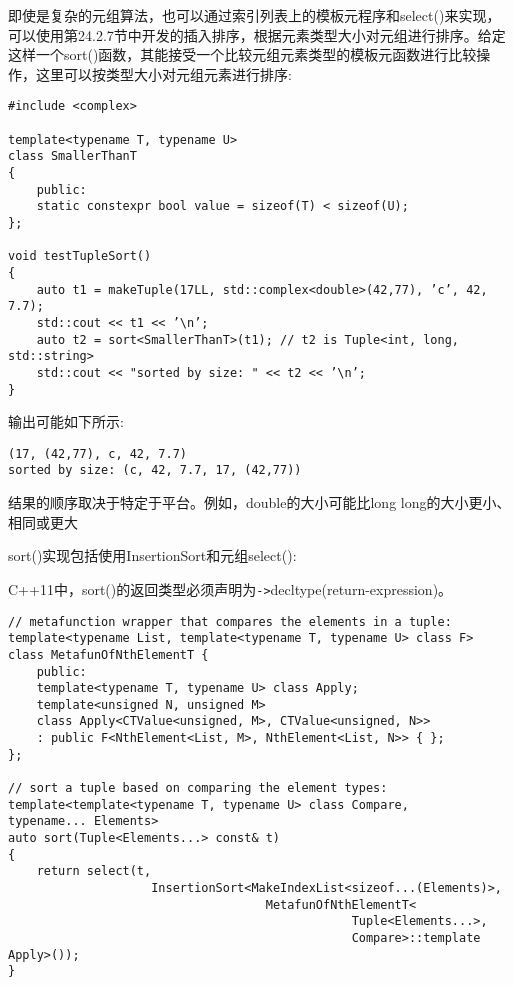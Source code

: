 即使是复杂的元组算法，也可以通过索引列表上的模板元程序和select()来实现，可以使用第24.2.7节中开发的插入排序，根据元素类型大小对元组进行排序。给定这样一个sort()函数，其能接受一个比较元组元素类型的模板元函数进行比较操作，这里可以按类型大小对元组元素进行排序:

\begin{lstlisting}[style=styleCXX]
#include <complex>

template<typename T, typename U>
class SmallerThanT
{
	public:
	static constexpr bool value = sizeof(T) < sizeof(U);
};

void testTupleSort()
{
	auto t1 = makeTuple(17LL, std::complex<double>(42,77), ’c’, 42, 7.7);
	std::cout << t1 << ’\n’;
	auto t2 = sort<SmallerThanT>(t1); // t2 is Tuple<int, long, std::string>
	std::cout << "sorted by size: " << t2 << ’\n’;
}
\end{lstlisting}

输出可能如下所示:

\begin{lstlisting}[style=styleCXX]
(17, (42,77), c, 42, 7.7)
sorted by size: (c, 42, 7.7, 17, (42,77))
\end{lstlisting}

\begin{tcolorbox}[colback=webgreen!5!white,colframe=webgreen!75!black]
\hspace*{0.75cm}结果的顺序取决于特定于平台。例如，double的大小可能比long long的大小更小、相同或更大
\end{tcolorbox}

sort()实现包括使用InsertionSort和元组select():

\begin{tcolorbox}[colback=webgreen!5!white,colframe=webgreen!75!black]
\hspace*{0.75cm}C++11中，sort()的返回类型必须声明为\texttt{->}decltype(return-expression)。
\end{tcolorbox}

\begin{lstlisting}[style=styleCXX]
// metafunction wrapper that compares the elements in a tuple:
template<typename List, template<typename T, typename U> class F>
class MetafunOfNthElementT {
	public:
	template<typename T, typename U> class Apply;
	template<unsigned N, unsigned M>
	class Apply<CTValue<unsigned, M>, CTValue<unsigned, N>>
	: public F<NthElement<List, M>, NthElement<List, N>> { };
};

// sort a tuple based on comparing the element types:
template<template<typename T, typename U> class Compare,
typename... Elements>
auto sort(Tuple<Elements...> const& t)
{
	return select(t,
					InsertionSort<MakeIndexList<sizeof...(Elements)>,
									MetafunOfNthElementT<
												Tuple<Elements...>,
												Compare>::template Apply>());
}
\end{lstlisting}

